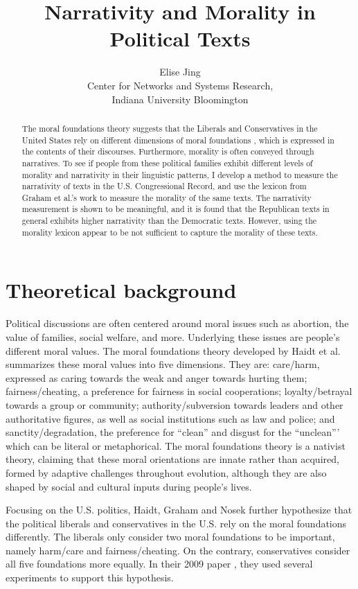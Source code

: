 \documentclass[a4paper]{article}
\title{Narrativity and Morality in Political Texts}
\author{Elise Jing \\Center for Networks and Systems Research,\\ Indiana University Bloomington}
\begin{document}
\maketitle

\begin{abstract}
The moral foundations theory suggests that the Liberals and Conservatives in the United States rely on different dimensions of moral foundations \cite{graham2009liberals}, which is expressed in the contents of their discourses. Furthermore, morality is often conveyed through narratives. To see if people from these political families exhibit different levels of morality and narrativity in their linguistic patterns, I develop a method to measure the narrativity of texts in the U.S. Congressional Record, and use the lexicon from Graham et al.'s work \cite{graham2009liberals} to measure the morality of the same texts. The narrativity measurement is shown to be meaningful, and it is found that the Republican texts in general exhibits higher narrativity than the Democratic texts. However, using the morality lexicon appear to be not sufficient to capture the morality of these texts.
\end{abstract}

\section*{Theoretical background}
Political discussions are often centered around moral issues such as abortion, the value of families, social welfare, and more. Underlying these issues are people's different moral values. The moral foundations theory developed by Haidt et al. \cite{graham2013moral}\cite{haidt2004intuitive}\cite{haidt2007moral} summarizes these moral values into five dimensions. They are: care/harm, expressed as caring towards the weak and anger towards hurting them; fairness/cheating, a preference for fairness in social cooperations; loyalty/betrayal towards a group or community; authority/subversion towards leaders and other authoritative figures, as well as social institutions such as law and police; and sanctity/degradation, the preference for ``clean'' and disgust for the ``unclean''' which can be literal or metaphorical. The moral foundations theory is a nativist theory, claiming that these moral orientations are innate rather than acquired, formed by adaptive challenges throughout evolution, although they are also shaped by social and cultural inputs during people's lives. 

Focusing on the U.S. politics, Haidt, Graham and Nosek further hypothesize that the political liberals and conservatives in the U.S. rely on the moral foundations differently. The liberals only consider two moral foundations to be important, namely harm/care and fairness/cheating. On the contrary, conservatives consider all five foundations more equally. In their 2009 paper \cite{graham2009liberals}, they used several experiments to support this hypothesis.
\end{document}
